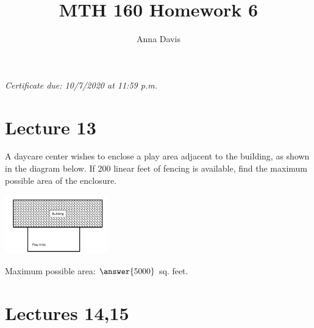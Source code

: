 \documentclass{ximera}
\author{Anna Davis} \title{MTH 160 Homework 6}
\begin{document}
\begin{abstract}

\end{abstract}
\maketitle
 \textit{Certificate due: 10/7/2020 at 11:59 p.m.}
 \section{Lecture 13}
 
  \begin{problem}\label{prob:160hom6prob1} 
 A daycare center wishes to enclose a play area adjacent to the building, as shown in the diagram below.  If 200 linear feet of fencing is available, find the maximum possible area of the enclosure. 
 \begin{image}
   \includegraphics[height=1in]{160H6pic1.jpg}
 \end{image}
 Maximum possible area: $\answer{5000}$ sq. feet.
 \end{problem}
 
  \section{Lectures 14,15}
 
\end{document}
